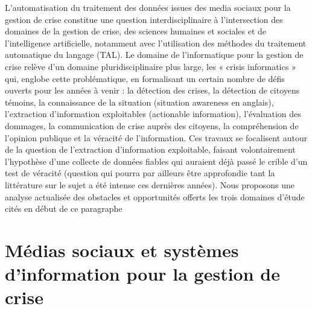 L'automatisation du traitement des données issues des media sociaux pour la gestion de crise constitue une question interdisciplinaire à l'intersection des domaines de la gestion de crise, des sciences humaines et sociales et de l'intelligence artificielle, notamment avec l'utilisation des méthodes du traitement automatique du langage (TAL).
Le domaine de l'informatique pour la gestion de crise relève d'un domaine pluridisciplinaire plus large, les « crisis informatics » qui, englobe cette problématique, en formalisant un certain nombre de défis ouverts pour les années à venir \parencite{imranUsingAISocial2020} : la détection des
crises, la détection de citoyens témoins, la connaissance de la situation (situation awareness en anglais), l'extraction d'information exploitables (actionable information),
l'évaluation des dommages, la communication de crise auprès des citoyens, la compréhension de l'opinion publique et la véracité de l'information.
Ces travaux se focalisent autour de la question de l'extraction d'information exploitable, faisant volontairement l'hypothèse d'une collecte de données fiables
qui auraient déjà passé le crible d'un test de véracité (question qui pourra par ailleurs être approfondie tant la littérature sur le sujet a été intense ces dernières années).
Nous proposons une analyse actualisée des obstacles et opportunités offerts les trois domaines d'étude cités en début de ce paragraphe

\section*{Médias sociaux et systèmes d'information pour la gestion de crise}

